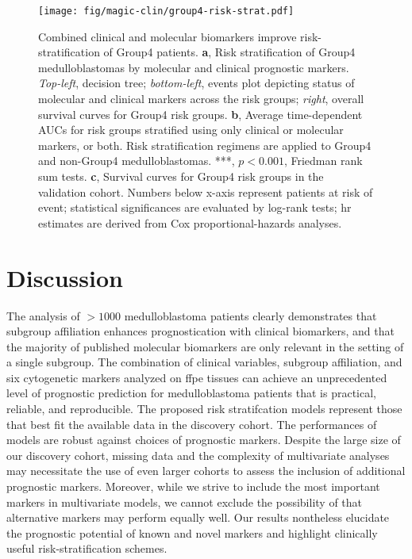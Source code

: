 \clearpage

\begin{figure}[h]
	\begin{center}
		\texttt{[image: fig/magic-clin/group4-risk-strat.pdf]}
	\end{center}
	\caption[Combined clinical and molecular biomarkers improve risk-stratification of Group4 patients]
	{Combined clinical and molecular biomarkers improve risk-stratification of Group4 patients.
	\textbf{a}, Risk stratification of Group4 medulloblastomas by molecular and clinical prognostic markers. \emph{Top-left}, decision tree; \emph{bottom-left}, events plot depicting status of molecular and clinical markers across the risk groups; \emph{right}, overall survival curves for Group4 risk groups.
	\textbf{b}, Average time-dependent AUCs for risk groups stratified using only clinical or molecular markers, or both. Risk stratification regimens are applied to Group4 and non-Group4 medulloblastomas. ***, $p < 0.001$, Friedman rank sum tests.
	\textbf{c}, Survival curves for Group4 risk groups in the validation cohort. 
	Numbers below x-axis represent patients at risk of event; statistical significances are evaluated by log-rank tests; \gls{hr} estimates are derived from Cox proportional-hazards analyses.
	}
	\label{fig:group4-risk-strat}
\end{figure}

\clearpage


\section{Discussion}

The analysis of $> 1000$ medulloblastoma patients clearly demonstrates that subgroup affiliation enhances prognostication with clinical biomarkers, and that the majority of published molecular biomarkers are only relevant in the setting of a single subgroup. The combination of clinical variables, subgroup affiliation, and six cytogenetic markers analyzed on \gls{ffpe} tissues can achieve an unprecedented level of prognostic prediction for medulloblastoma patients that is practical, reliable, and reproducible. The proposed risk stratifcation models represent those that best fit the available data in the discovery cohort. The performances of models are robust against choices of prognostic markers. Despite the large size of our discovery cohort, missing data and the complexity of multivariate analyses may necessitate the use of even larger cohorts to assess the inclusion of additional prognostic markers. Moreover, while we strive to include the most important markers in multivariate models, we cannot exclude the possibility of that alternative markers may perform equally well. Our results nontheless elucidate the prognostic potential of known and novel markers and highlight clinically useful risk-stratification schemes.

